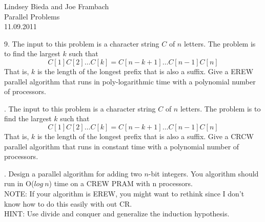 \documentclass[10pt]{article}
\begin{document}
	\begin{flushright}
	Lindsey Bieda and Joe Frambach\\
	Parallel Problems\\
	11.09.2011
	\end{flushright}

9. The input to this problem is a character string $C$ of $n$ letters. The problem is to find the largest $k$
such that
\[C[1]C[2] \ldots C[k] = C[n - k + 1] \ldots C[n - 1]C[n]\]
That is, $k$ is the length of the longest prefix that is also a suffix. Give a EREW parallel algorithm that
runs in poly-logarithmic time with a polynomial number of processors.

. The input to this problem is a character string $C$ of $n$ letters. The problem is to find the largest $k$
such that
\[C[1]C[2] \ldots C[k] = C[n - k + 1] \ldots C[n - 1]C[n]\]
That is, $k$ is the length of the longest prefix that is also a suffix. Give a CRCW parallel algorithm that
runs in constant time with a polynomial number of processors.

. Design a parallel algorithm for adding two $n$-bit integers. You algorithm should run in O($log~n$) time
on a CREW PRAM with n processors.\\
NOTE: If your algorithm is EREW, you might want to rethink since I don't know how to do this easily
with out CR.\\
HINT: Use divide and conquer and generalize the induction hypothesis.
\end{document}
